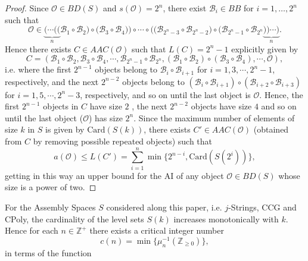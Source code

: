 \documentclass[letterpaper,12pt]{article}
\theoremstyle{definition}
\begin{document}
\begin{proof}
  Since $\mathscr{O} \in BD(S)$ and $s(\mathscr{O})=2^n$, there exist $\mathscr{B}_i \in BB$ for $i=1,\dots,2^n$ such that 
\begin{equation*}
     \mathscr{O} \in \underbrace{\big( \cdots \big( \big(}_{n}\mathscr{B}_1 \circ \mathscr{B}_2 \big) \circ \big(\mathscr{B}_3 \circ \mathscr{B}_4 \big) \big) \circ \cdots \circ \big( \big(\mathscr{B}_{2^{n}-3} \circ \mathscr{B}_{2^{n}-2} \big) \circ \big( \mathscr{B}_{2^{n}-1} \circ \mathscr{B}_{2^{n}}\underbrace{\big) \big) \cdots \big)}_{n}.
\end{equation*} 
Hence there exists $C \in AAC(\mathscr{O})$ such that $L(C)=2^n-1$ explicitly given by
\begin{equation}\label{AACproof}
    C= (\mathscr{B}_1 \circ \mathscr{B}_2, \mathscr{B}_3 \circ \mathscr{B}_4,\cdots,\mathscr{B}_{2^n-1}\circ \mathscr{B}_{2^n},(\mathscr{B}_1 \circ \mathscr{B}_2)\circ(\mathscr{B}_3 \circ \mathscr{B}_4), \cdots, \mathscr{O}),
\end{equation}
i.e. where the first $2^{n-1}$ objects belong to $\mathscr{B}_i \circ \mathscr{B}_{i+1}$ for $i=1,3,\cdots,2^n-1$, respectively, and the next $2^{n-2}$ objects belong to $(\mathscr{B}_i \circ \mathscr{B}_{i+1}) \circ (\mathscr{B}_{i+2} \circ \mathscr{B}_{i+3})$ for $i=1,5,\cdots,2^{n}-3$, respectively, and so on until the last object is $\mathscr{O}$. Hence, the first $2^{n-1}$ objects in $C$ have size $2$ , the next $2^{n-2}$ objects have size $4$ and so on until the last object ($\mathscr{O}$) has size $2^n$. Since the maximum number of elements of size $k$ in $S$ is given by $\text{Card}(S(k))$, there exists $C' \in AAC(\mathscr{O})$ (obtained from $C$ by removing possible repeated objects) such that  
\begin{equation*}
    a(\mathscr{O}) \leq L(C') = \sum^n_{i=1} \min \{2^{n-i},\text{Card}(S(2^i)) \},
\end{equation*}
getting in this way an upper bound for the AI of any object $\mathscr{O} \in BD(S)$ whose size is a power of two.
\end{proof}
For the Assembly Spaces $S$ considered along this paper, i.e. $j$-Strings, CCG and CPoly, the cardinality of the level sets $S(k)$ increases monotonically with $k$. Hence for each $n \in \mathbb{Z}^+$ there exists a critical integer number  
\begin{equation}\label{c_n}
    c(n)= \min \{ \mu_n^{-1}(\mathbb{Z}_{\geq 0}) \},
\end{equation}
in terms of the function 
\end{document}
